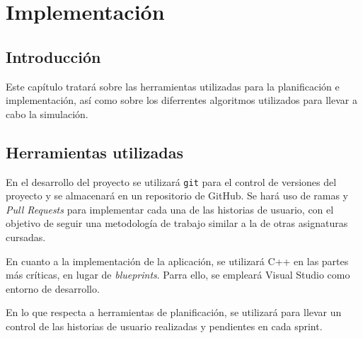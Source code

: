\chapter{Implementación}

\section{Introducción}

Este capítulo tratará sobre las herramientas utilizadas para la planificación e implementación, así como sobre los diferrentes algoritmos utilizados para llevar a cabo la simulación.

\section{Herramientas utilizadas}
En el desarrollo del proyecto se utilizará \verb|git| para el control de versiones del proyecto y se almacenará en un repositorio de GitHub. Se hará uso de ramas y \textit{Pull Requests} para implementar cada una de las historias de usuario, con el objetivo de seguir una metodología de trabajo similar a la de otras asignaturas cursadas.


\bigskip

En cuanto a la implementación de la aplicación, se utilizará C++ en las partes más críticas, en lugar de \textit{blueprints}. Parra ello, se empleará Visual Studio como entorno de desarrollo.

\bigskip

En lo que respecta a herramientas de planificación, se utilizará \planApp para llevar un control de las historias de usuario realizadas y pendientes en cada sprint.

